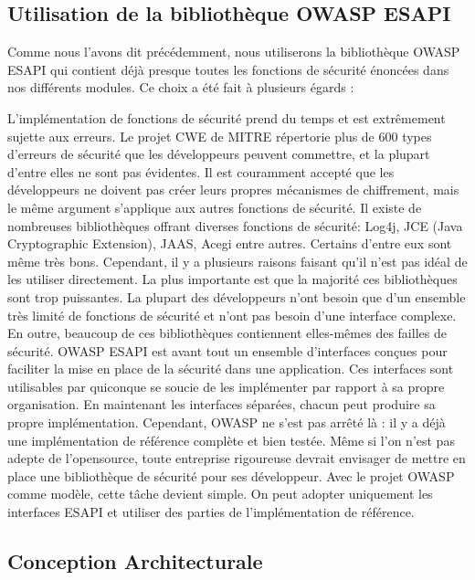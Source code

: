 \subsection{Utilisation de la bibliothèque OWASP ESAPI}
Comme nous l'avons dit précédemment, nous utiliserons la bibliothèque OWASP ESAPI qui contient déjà presque toutes les fonctions de sécurité énoncées dans nos différents modules. Ce choix a été fait à plusieurs égards :
\begin{itemize}
	\itemtirait L'implémentation de fonctions de sécurité prend du temps et est extrêmement sujette aux erreurs. Le projet CWE de MITRE répertorie plus de 600 types d’erreurs de sécurité que les développeurs peuvent commettre, et la plupart d’entre elles ne sont pas évidentes. Il est couramment accepté que les développeurs ne doivent pas créer leurs propres mécanismes de chiffrement, mais le même argument s'applique aux autres fonctions de sécurité.
	\itemtirait Il existe de nombreuses bibliothèques offrant diverses fonctions de sécurité: Log4j, JCE (Java Cryptographic Extension), JAAS, Acegi entre autres. Certains d'entre eux sont même très bons. Cependant, il y a plusieurs raisons faisant qu'il n'est pas idéal de les utiliser directement. La plus importante est que la majorité ces bibliothèques sont trop puissantes. La plupart des développeurs n’ont besoin que d’un ensemble très limité de fonctions de sécurité et n’ont pas besoin d’une interface complexe. En outre, beaucoup de ces bibliothèques contiennent elles-mêmes des failles de sécurité.
	\itemtirait OWASP ESAPI est avant tout un ensemble d'interfaces conçues pour faciliter la mise en place de la sécurité dans une application. Ces interfaces sont utilisables par quiconque se soucie de les implémenter par rapport à sa propre organisation. En maintenant les interfaces séparées, chacun peut produire sa propre implémentation. Cependant, OWASP ne s'est pas arrêté là : il y a déjà une implémentation de référence complète et bien testée.
	\itemtirait Même si l'on n'est pas adepte de l'opensource, toute entreprise rigoureuse devrait envisager de mettre en place une bibliothèque de sécurité pour ses développeur. Avec le projet OWASP comme modèle, cette tâche devient simple. On peut adopter uniquement les interfaces ESAPI et utiliser des parties de l’implémentation de référence.
\end{itemize}
\subsection{Conception Architecturale}
